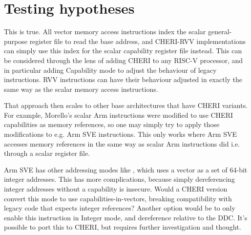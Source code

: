 \section{Testing hypotheses}

This is true.
All vector memory access instructions index the scalar general-purpose register file to read the base address, and CHERI-RVV implementations can simply use this index for the scalar capability register file instead.
This can be considered through the lens of adding CHERI to any RISC-V processor, and in particular adding Capability mode to adjust the behaviour of legacy instructions.
RVV instructions can have their behaviour adjusted in exactly the same way as the scalar memory access instructions.

That approach then scales to other base architectures that have CHERI variants.
For example, Morello's scalar Arm instructions were modified to use CHERI capabilities as memory references\cite[Section 1.3]{armltdMorelloArchitectureReference2021}, so one may simply try to apply those modifications to e.g. Arm SVE instructions.
This only works where Arm SVE accesses memory references in the same way as scalar Arm instructions did i.e. through a scalar register file.

Arm SVE has other addressing modes like , which uses a vector as a set of 64-bit integer addresses\cite{armltdArmCompilerScalable2019}.
This has more complications, because simply dereferencing integer addresses without a capability is insecure.
Would a CHERI version convert this mode to use capabilities-in-vectors, breaking compatibility with legacy code that expects integer references?
Another option would be to only enable this instruction in Integer mode, and dereference relative to the DDC.
It's possible to port this to CHERI, but requires further investigation and thought.




